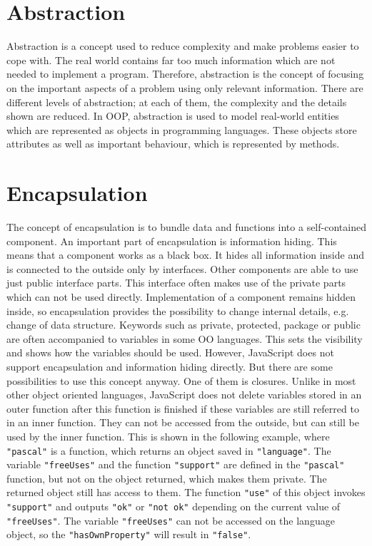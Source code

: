 \documentclass{bioinfo}
\begin{document}
\section{Abstraction}
Abstraction is a concept used to reduce complexity and make problems easier to cope with. The real world contains far too much information which are not needed to implement a program. Therefore, abstraction is the concept of focusing on the important aspects of a problem using only relevant information. There are different levels of abstraction; at each of them, the complexity and the details shown are reduced.
In OOP, abstraction is used to model real-world entities which are represented as objects in programming languages. These objects store attributes as well as important behaviour, which is represented by methods.

\section{Encapsulation}
The concept of encapsulation is to bundle data and functions into a self-contained component. An important part of encapsulation is information hiding. This means that a component works as a black box. It hides all information inside and is connected to the outside only by interfaces. Other components are able to use just public interface parts. This interface often makes use of the private parts which can not be used directly. Implementation of a component remains hidden inside, so encapsulation provides the possibility to change internal details, e.g. change of data structure.
Keywords such as private, protected, package or public are often accompanied to variables in some OO languages. This sets the visibility and shows how the variables should be used. 
However, JavaScript does not support encapsulation and information hiding directly. But there are some possibilities to use this concept anyway. One of them is closures. Unlike in most other object oriented languages, JavaScript does not delete variables stored in an outer function after this function is finished if these variables are still referred to in an inner function. They can not be accessed from the outside, but can still be used by the inner function. This is shown in the following example, where \texttt{"pascal"} is a function, which returns an object saved in \texttt{"language"}. The variable \texttt{"freeUses"} and the function \texttt{"support"} are defined in the \texttt{"pascal"} function, but not on the object returned, which makes them private. The returned object still has access to them. The function \texttt{"use"} of this object invokes \texttt{"support"} and outputs \texttt{"ok"} or \texttt{"not ok"} depending on the current value of \texttt{"freeUses"}. The variable \texttt{"freeUses"} can not be accessed on the language object, so the \texttt{"hasOwnProperty"} will result in \texttt{"false"}.
\end{document}
